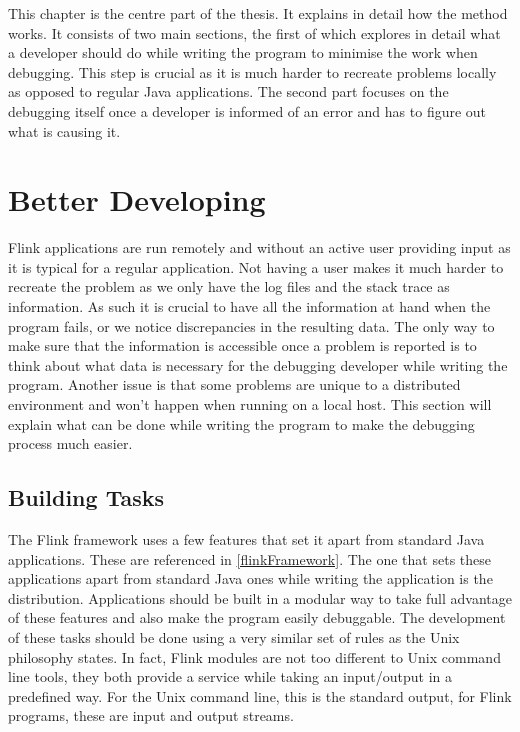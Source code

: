 
This chapter is the centre part of the thesis. It explains in detail how the method works. It consists of two main sections, the first of which explores in detail what a developer should do while writing the program to minimise the work when debugging. This step is crucial as it is much harder to recreate problems locally as opposed to regular Java applications. The second part focuses on the debugging itself once a developer is informed of an error and has to figure out what is causing it.

\section{Better Developing}
Flink applications are run remotely and without an active user providing input as it is typical for a regular application. Not having a user makes it much harder to recreate the problem as we only have the log files and the stack trace as information. As such it is crucial to have all the information at hand when the program fails, or we notice discrepancies in the resulting data. The only way to make sure that the information is accessible once a problem is reported is to think about what data is necessary for the debugging developer while writing the program. Another issue is that some problems are unique to a distributed environment and won't happen when running on a local host. This section will explain what can be done while writing the program to make the debugging process much easier.

\pagebreak

\subsection{Building Tasks}
The Flink framework uses a few features that set it apart from standard Java applications. These are referenced in \ref{flinkFramework}. The one that sets these applications apart from standard Java ones while writing the application is the distribution. Applications should be built in a modular way to take full advantage of these features and also make the program easily debuggable.
The development of these tasks should be done using a very similar set of rules as the Unix philosophy states. In fact, Flink modules are not too different to Unix command line tools, they both provide a service while taking an input/output in a predefined way. For the Unix command line, this is the standard output, for Flink programs, these are input and output streams.


